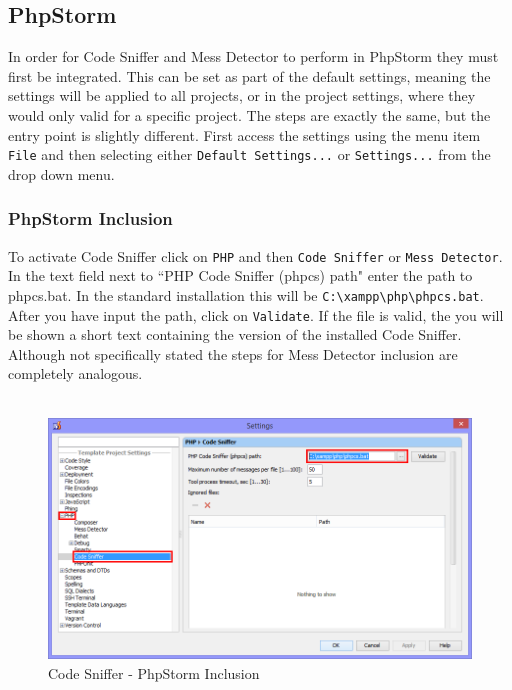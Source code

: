 \documentclass[]{report}
\begin{document}
\newpage

\subsection{PhpStorm}

In order for Code Sniffer and Mess Detector to perform in PhpStorm they must first be integrated. This can be set as part of the default settings, meaning the settings will be applied to all projects, or in the project settings, where they would only valid for a specific project. The steps are exactly the same, but the entry point is slightly different. First access the settings using the menu item \texttt{File} and then selecting either \texttt{Default Settings...} or \texttt{Settings...} from the drop down menu.

\subsubsection{PhpStorm Inclusion}

To activate Code Sniffer click on \texttt{PHP} and then \texttt{Code Sniffer} or \texttt{Mess Detector}. In the text field next to ``PHP Code Sniffer (phpcs) path" enter the path to phpcs.bat. In the standard installation this will be \texttt{C:\textbackslash xampp\textbackslash php\textbackslash phpcs.bat}. After you have input the path, click on \texttt{Validate}. If the file is valid, the you will be shown a short text containing the version of the installed Code Sniffer. Although not specifically stated the steps for Mess Detector inclusion are completely analogous.\\
\\
\begin{figure}[h] 
	\centering
	\includegraphics[width=14cm]{codesnifferinclusion.png}
	\caption{Code Sniffer - PhpStorm Inclusion}
\end{figure}
\end{document}
